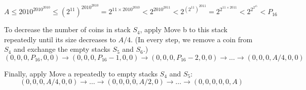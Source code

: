 \begin{problem}
$$A\le 2010^{2010^{2010}}  \le (2^{11})^{2010^{2010}} = 2^{11\times 2010^{2010}} < 2^{2010^{2011}} < 2^{(2^{11})^{2011}}=2^{2^{11\times 2011}} < 2^{2^{2^{15}}} < P_{16}$$

To decrease the number of coins in stack $S_4$, apply Move b to this stack repeatedly until its size decreases to $A/4$. (In every step, we remove a coin from $S_4$ and exchange the empty stacks $S_5$ and $S_6$.) 
$$(0,0,0,P_{16},0,0) \rightarrow (0,0,0,P_{16}-1,0,0) \rightarrow (0,0,0,P_{16}-2,0,0) \rightarrow \dots \rightarrow (0,0,0,A/4,0,0)$$

Finally, apply Move a repeatedly to empty stacks $S_4$ and $S_5$: 
$$(0,0,0,A/4,0,0) \rightarrow \dots \rightarrow (0,0,0,0,A/2,0) \rightarrow \dots \rightarrow (0,0,0,0,0,A)$$

\end{problem}

